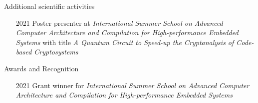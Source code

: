 \documentclass[
	a4paper, %
	11pt, %
]{resume} %
\newif\ifpublic{}
\begin{document}
\begin{rSection}{Additional scientific activities}
  \begin{itemize}
  \item[2021] Poster presenter at \emph{International Summer School on Advanced
      Computer Architecture and Compilation for High-performance Embedded
      Systems } with title \emph{A Quantum Circuit to Speed-up the Cryptanalysis
      of Code-based Cryptosystems}
  \end{itemize}
\end{rSection}
\begin{rSection}{Awards and Recognition}
  \begin{itemize}
  \item[2021] Grant winner for \emph{International Summer School on Advanced
      Computer Architecture and Compilation for High-performance Embedded
      Systems}
  \end{itemize}
\end{rSection}
\vfill
\ifpublic{%
    
    
  }
\fi
\end{document}

